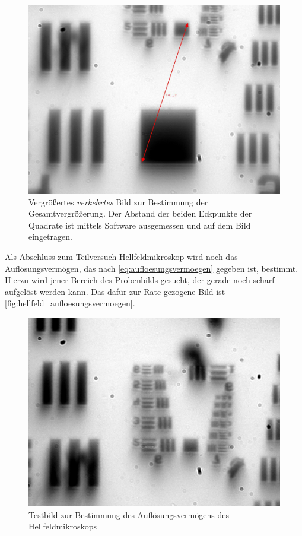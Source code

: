 \documentclass[ngerman]{scrartcl}
\begin{document}
\begin{figure}[H]
\begin{minipage}[t]{0.475\linewidth}
        \includegraphics[width=\linewidth]{fig/Versuch3/hellfeld_4.1_vergroeszert.jpg}
        \caption[Hellfeld Gesamtvergrößerung vergrößert]{Vergrößertes \emph{verkehrtes} Bild zur Bestimmung der Gesamtvergrößerung. Der Abstand der beiden Eckpunkte der Quadrate ist mittels Software ausgemessen und auf dem Bild eingetragen.}
        \label{fig:hellfeld_gesamtvergroeszerung_vergroeszert}
    \end{minipage}
\end{figure}
\setcaphanging
%
Als Abschluss zum Teilversuch Hellfeldmikroskop wird noch das Auflösungsvermögen, das nach \autoref{eq:aufloesungsvermoegen} gegeben ist, bestimmt. Hierzu wird jener Bereich des Probenbilds gesucht, der gerade noch scharf aufgelöst werden kann. Das dafür zur Rate gezogene Bild ist \autoref{fig:hellfeld_aufloesungsvermoegen}.
%
\begin{figure}[H]
    \centering
    \begin{samepage}
        \includegraphics[width=0.475\linewidth]{fig/Versuch3/hellfeld_4.2_aufloesungsvermoegen.jpg}
        \caption[Hellfeld Auflösungsvermögen]{Testbild zur Bestimmung des Auflösungsvermögens des Hellfeldmikroskops}
        \label{fig:hellfeld_aufloesungsvermoegen}
    \end{samepage}
\end{figure}
\end{document}
